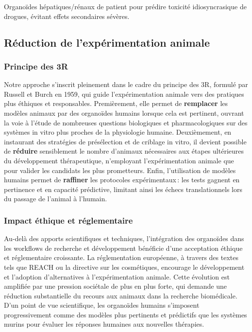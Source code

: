 Organoïdes hépatiques/rénaux de patient pour prédire toxicité idiosyncrasique de drogues, évitant effets secondaires sévères.

\subsection{Réduction de l'expérimentation animale}

\subsubsection{Principe des 3R}

Notre approche s’inscrit pleinement dans le cadre du principe des 3R, formulé par Russell et Burch en 1959, qui guide l’expérimentation animale vers des pratiques plus éthiques et responsables. Premièrement, elle permet de \textbf{remplacer} les modèles animaux par des organoïdes humains lorsque cela est pertinent, ouvrant la voie à l’étude de nombreuses questions biologiques et pharmacologiques sur des systèmes in vitro plus proches de la physiologie humaine. Deuxièmement, en instaurant des stratégies de présélection et de criblage in vitro, il devient possible de \textbf{réduire} sensiblement le nombre d’animaux nécessaires aux étapes ultérieures du développement thérapeutique, n’employant l’expérimentation animale que pour valider les candidats les plus prometteurs. Enfin, l’utilisation de modèles humains permet de \textbf{raffiner} les protocoles expérimentaux : les tests gagnent en pertinence et en capacité prédictive, limitant ainsi les échecs translationnels lors du passage de l’animal à l’humain.

\subsubsection{Impact éthique et réglementaire}

Au-delà des apports scientifiques et techniques, l’intégration des organoïdes dans les workflows de recherche et développement bénéficie d’une acceptation éthique et réglementaire croissante. La réglementation européenne, à travers des textes tels que REACH ou la directive sur les cosmétiques, encourage le développement et l’adoption d’alternatives à l’expérimentation animale. Cette évolution est amplifiée par une pression sociétale de plus en plus forte, qui demande une réduction substantielle du recours aux animaux dans la recherche biomédicale. D’un point de vue scientifique, les organoïdes humains s’imposent progressivement comme des modèles plus pertinents et prédictifs que les systèmes murins pour évaluer les réponses humaines aux nouvelles thérapies.

